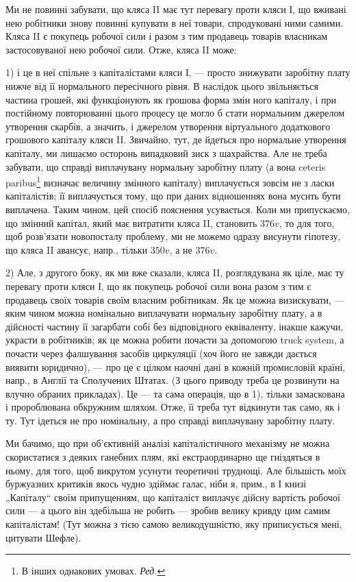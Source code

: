 Ми не повинні забувати, що кляса II має тут перевагу проти кляси І,
що вживані нею робітники знову повинні купувати в неї товари, спродуковані
ними самими. Кляса II є покупець робочої сили і разом з тим
продавець товарів власникам застосовуваної нею робочої сили. Отже,
кляса II може:

1) і це в неї спільне з капіталістами кляси І, — просто знижувати
заробітну плату нижче від її нормального пересічного рівня. В наслідок цього
звільняється частина грошей, які функціонують як грошова форма змін
ного капіталу, і при постійному повторюванні цього процесу це могло б
стати нормальним джерелом утворення скарбів, а значить, і джерелом
утворення віртуального додаткового грошового капіталу кляси II. Звичайно,
тут, де йдеться про нормальне утворення капіталу, ми лишаємо
осторонь випадковий зиск з шахрайства. Але не треба забувати, що
справді виплачувану нормальну заробітну плату (а вона ceteris paribus\footnote*{
В інших однакових умовах. \emph{Ред.}
}
визначає величину змінного капіталу) виплачується зовсім не з ласки
капіталістів; її виплачується тому, що при даних відношеннях вона
мусить бути виплачена. Таким чином, цей спосіб пояснення усувається.
Коли ми припускаємо, що змінний капітал, який має витратити кляса II,
становить $376 v$, то для того, щоб розв’язати новопосталу проблему, ми
не можемо одразу висунути гіпотезу, що кляса II авансує, напр., тільки
$350 v$, а не $376 v$.

2) Але, з другого боку, як ми вже сказали, кляса II, розглядувана як
ціле, має ту перевагу проти кляси І, що як покупець робочої сили вона
разом з тим є продавець своїх товарів своїм власним робітникам. Як це
можна визискувати, — яким чином можна номінально виплачувати нормальну
заробітну плату, а в дійсності частину її загарбати собі без відповідного
еквіваленту, інакше кажучи, украсти в робітників; як це можна робити
почасти за допомогою truck system, а почасти через фалшування засобів
циркуляції (хоч його не завжди дається виявити юридично), — про
це є цілком наочні дані в кожній промисловій країні, напр., в Англії та
Сполучених Штатах. (З цього приводу треба це розвинути на влучно
обраних прикладах). Це — та сама операція, що в 1), тільки замаскована
і пророблювана обкружним шляхом. Отже, її треба тут відкинути так
само, як і ту. Тут ідеться не про номінальну, а про справді виплачувану
заробітну плату.

Ми бачимо, що при об’єктивній аналізі капіталістичного механізму не
можна скористатися з деяких ганебних плям, які екстраординарно ще
гніздяться в ньому, для того, щоб викрутом усунути теоретичні труднощі.
Але більшість моїх буржуазних критиків якось чудно здіймає галас, ніби
я, прим., в І книзі „Капіталу“ своїм припущенням, що капіталіст виплачує
дійсну вартість робочої сили — а цього він здебільша не робить —
зробив велику кривду цим самим капіталістам! (Тут можна з тією самою
великодушністю, яку приписується мені, цитувати Шефле).

